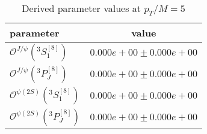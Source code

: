 \documentclass[a4paper, 11pt]{scrartcl}
\newcommand{\Swave}[3]{{}^{#1}S_{#2}^{[#3]}}
\newcommand{\Pwave}[2]{{}^{3}P_{#1}^{[#2]}}
\newcommand{\ldme}[2]{\mathcal{O}^{#1}(#2)}
\begin{document}
\begin{table}
\centering
\begin{tabulary}{1.0\linewidth}{l | c}
parameter & value \\ \hline
$\ldme{J/\psi}{\Swave{3}{1}{8}}$ & $0.000e+00 \pm 0.000e+00$ \\
$\ldme{J/\psi}{\Pwave{J}{8}}$ & $0.000e+00 \pm 0.000e+00$ \\
$\ldme{\psi(2S)}{\Swave{3}{1}{8}}$ & $0.000e+00 \pm 0.000e+00$ \\
$\ldme{\psi(2S)}{\Pwave{J}{8}}$ & $0.000e+00 \pm 0.000e+00$ \\
\end{tabulary}
\caption{Derived parameter values at $p_{T}/M = 5$}
\end{table}
\end{document}
